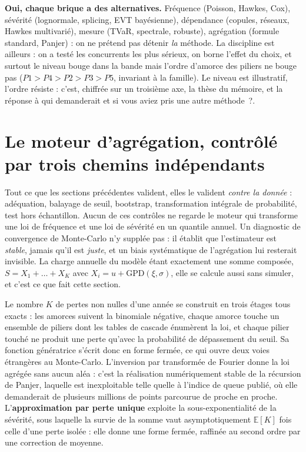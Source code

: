 \begin{cle}
\textbf{Oui, chaque brique a des alternatives.} Fréquence (Poisson, Hawkes, Cox), sévérité
(lognormale, splicing, EVT bayésienne), dépendance (copules, réseaux, Hawkes multivarié),
mesure (TVaR, spectrale, robuste), agrégation (formule standard, Panjer) : on ne prétend pas
détenir \emph{la} méthode. La discipline est ailleurs : on a testé les concurrents les plus
sérieux, on borne l'effet du choix, et surtout le niveau bouge dans la bande mais
l'ordre d'amorce des piliers ne bouge pas ($P1>P4>P2>P3>P5$, invariant à la famille).
Le niveau est illustratif, l'ordre résiste : c'est, chiffrée sur un troisième axe, la thèse du
mémoire, et la réponse à qui demanderait \og et si vous aviez pris une autre méthode~?\fg.
\end{cle}

\section{Le moteur d'agrégation, contrôlé par trois chemins indépendants}
\label{sec:triangulation-agregation}

Tout ce que les sections précédentes valident, elles le valident \emph{contre la donnée} :
adéquation, balayage de seuil, bootstrap, transformation intégrale de probabilité, test hors
échantillon. Aucun de ces contrôles ne regarde le moteur qui transforme une loi de fréquence et
une loi de sévérité en un quantile annuel. Un diagnostic de convergence de Monte-Carlo n'y
supplée pas : il établit que l'estimateur est \emph{stable}, jamais qu'il est \emph{juste}, et un
biais systématique de l'agrégation lui resterait invisible. La charge annuelle du modèle étant
exactement une somme composée, $S=X_1+\dots+X_K$ avec $X_i = u + \mathrm{GPD}(\xi,\sigma)$, elle
se calcule aussi sans simuler, et c'est ce que fait cette section.

Le nombre $K$ de pertes non nulles d'une année se construit en trois étages tous exacts : les
amorces suivent la binomiale négative, chaque amorce touche un ensemble de piliers dont les
tables de cascade énumèrent la loi, et chaque pilier touché ne produit une perte qu'avec la
probabilité de dépassement du seuil. Sa fonction génératrice s'écrit donc en forme fermée, ce qui
ouvre deux voies étrangères au Monte-Carlo. L'inversion par transformée de Fourier donne
la loi agrégée sans aucun aléa : c'est la réalisation numériquement stable de la récursion de
Panjer, laquelle est inexploitable telle quelle à l'indice de queue publié, où elle demanderait
de plusieurs millions de points parcourue de proche en proche. L'\textbf{approximation par perte
unique} exploite la sous-exponentialité de la sévérité, sous laquelle la survie de la somme vaut
asymptotiquement $\mathbb{E}[K]$ fois celle d'une perte isolée : elle donne une forme fermée,
raffinée au second ordre par une correction de moyenne.

